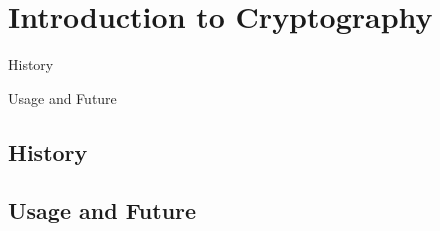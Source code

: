 \chapter{Introduction to Cryptography}

\begin{introduction}[Contents]
    \item History
    \item Usage and Future
\end{introduction}


\section{History}
\lipsum
\newpage

\section{Usage and Future}
\lipsum
\newpage
